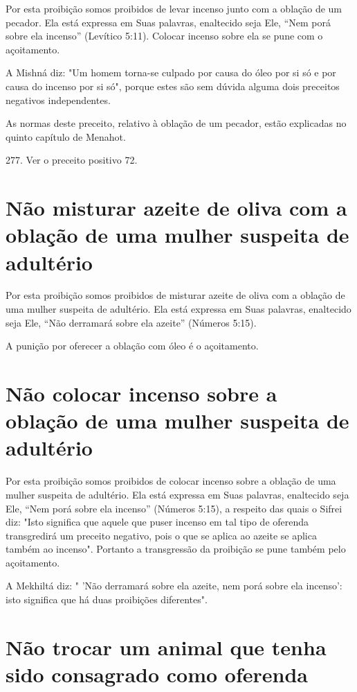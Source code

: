 Por esta proibição somos proibidos de levar incenso junto com a oblação
de um pecador. Ela está expressa em Suas palavras, enaltecido seja Ele,
``Nem porá sobre ela incenso'' (Levítico 5:11). Colocar incenso sobre ela
se pu­ne com o açoitamento.

A Mishná diz: "Um homem torna-se culpado por causa do óleo por si só e
por causa do incenso por si só", porque estes são sem dúvida alguma dois
preceitos negativos independentes.

As normas deste preceito, relativo à oblação de um pecador, estão
explicadas no quinto capítulo de Menahot.

277. Ver o preceito positivo 72.


\section{Não misturar azeite de oliva com a oblação de uma mulher suspeita de adultério}

Por esta proibição somos proibidos de misturar azeite de oliva com a
oblação de uma mulher suspeita de adultério. Ela está expressa em Suas
pala­vras, enaltecido seja Ele, ``Não derramará sobre ela azeite''
(Números 5:15).

A punição por oferecer a oblação com óleo é o açoitamento.

\section{Não colocar incenso sobre a oblação de uma mulher suspeita de adultério}

Por esta proibição somos proibidos de colocar incenso sobre a obla­ção
de uma mulher suspeita de adultério. Ela está expressa em Suas palavras,
enaltecido seja Ele, ``Nem porá sobre ela incenso'' (Números 5:15), a
respeito das quais o Sifrei diz: "Isto significa que aquele que puser
incenso em tal tipo de oferenda transgredirá um preceito negativo, pois
o que se aplica ao azeite se aplica também ao incenso". Portanto a
transgressão da proibição se pune também pelo açoitamento.

A Mekhiltá diz: " 'Não derramará sobre ela azeite, nem porá sobre ela
incenso': isto significa que há duas proibições diferentes".

\section{Não trocar um animal que tenha sido consagrado como oferenda}

